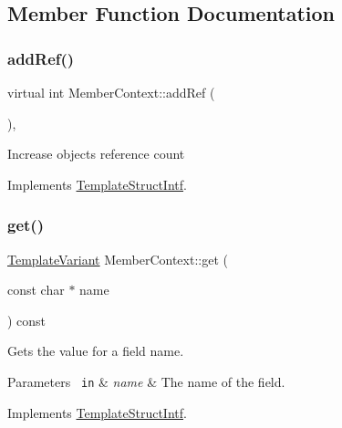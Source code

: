 \subsection{Member Function Documentation}
\mbox{\label{class_member_context_abe50fc6291c9d139677b7a8263831d89}} 
\subsubsection{\texorpdfstring{addRef()}{addRef()}}
{\footnotesize\ttfamily virtual int Member\+Context\+::add\+Ref (\begin{DoxyParamCaption}{ }\end{DoxyParamCaption})\hspace{0.3cm}{\ttfamily [inline]}, {\ttfamily [virtual]}}

Increase object\textquotesingle{}s reference count 

Implements \mbox{\hyperlink{class_template_struct_intf_a05fe97ad47633beb326f69686faed581}{Template\+Struct\+Intf}}.

\mbox{\label{class_member_context_ab9b8559215dd4bcfef722c04c0d4a375}} 
\subsubsection{\texorpdfstring{get()}{get()}}
{\footnotesize\ttfamily \mbox{\hyperlink{class_template_variant}{Template\+Variant}} Member\+Context\+::get (\begin{DoxyParamCaption}\item[{const char $\ast$}]{name }\end{DoxyParamCaption}) const\hspace{0.3cm}{\ttfamily [virtual]}}

Gets the value for a field name. 
\begin{DoxyParams}[1]{Parameters}
\mbox{\texttt{ in}}  & {\em name} & The name of the field. \\
\hline
\end{DoxyParams}


Implements \mbox{\hyperlink{class_template_struct_intf_a3d610cb81b4adbb531ebed3aa3d09b51}{Template\+Struct\+Intf}}.

\mbox{\label{class_member_context_a92d2b4bfdec4af678bf20c69891fac29}} 
